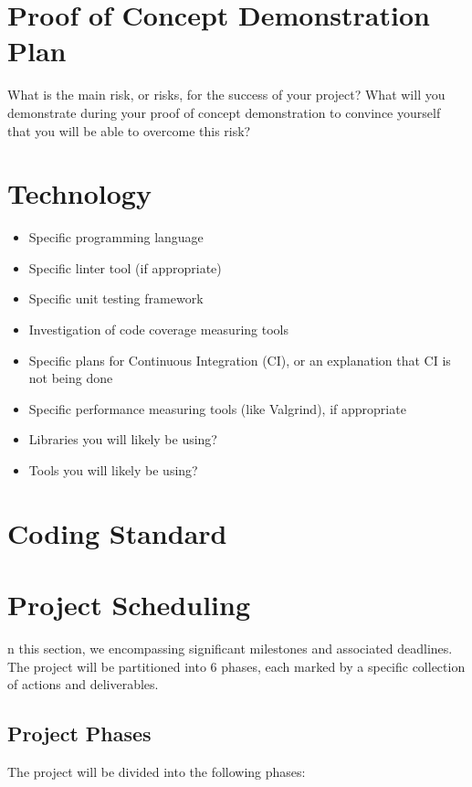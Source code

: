 \documentclass{article}
\begin{document}
\section{Proof of Concept Demonstration Plan}

What is the main risk, or risks, for the success of your project?  What will you
demonstrate during your proof of concept demonstration to convince yourself that
you will be able to overcome this risk?


\section{Technology}

\begin{itemize}
\item Specific programming language
\item Specific linter tool (if appropriate)
\item Specific unit testing framework
\item Investigation of code coverage measuring tools
\item Specific plans for Continuous Integration (CI), or an explanation that CI
  is not being done
\item Specific performance measuring tools (like Valgrind), if
  appropriate
\item Libraries you will likely be using?
\item Tools you will likely be using?
\end{itemize}

\section{Coding Standard}

\section{Project Scheduling}

n this section, we encompassing significant milestones and associated deadlines. The project will be partitioned into 6 phases, each marked by a specific collection of actions and deliverables.

\subsection{Project Phases}

The project will be divided into the following phases:
\end{document}
